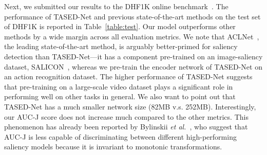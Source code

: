 \documentclass[10pt,twocolumn,letterpaper]{article}
\newcommand{\modelname}{TASED-Net}
\begin{document}
\begin{table}[!t]
\centering
{}
\caption{Performance comparison of \modelname{} with different $T$s (shown in parentheses) and temporal aggregation strategies on the validation set of DHF1K~\cite{wang2018revisiting}. The late two-step approach performs the best since it utilizes temporally rich features while avoiding overfitting.}
\label{table:val}
\end{table}

Next, we submitted our results to the DHF1K online benchmark~\cite{wang2018revisiting}. The performance of \modelname{} and previous state-of-the-art methods on the test set of DHF1K is reported in Table~\ref{table:test}. Our model outperforms other methods by a wide margin across all evaluation metrics. We note that ACLNet~\cite{wang2018revisiting}, the leading state-of-the-art method, is arguably better-primed for saliency detection than \modelname{}---it has a component pre-trained on an image-saliency dataset, SALICON~\cite{jiang2015salicon}, whereas we pre-train the encoder network of \modelname{} on an action recognition dataset. The higher performance of \modelname{} suggests that pre-training on a large-scale video dataset plays a significant role in performing well on other tasks in general. We also want to point out that \modelname{} has a much smaller network size (82MB v.s. 252MB). Interestingly, our AUC-J score does not increase much compared to the other metrics. This phenomenon has already been reported by Bylinskii \textit{et al.}~\cite{bylinskii2018different}, who suggest that AUC-J is less capable of discriminating between different high-performing saliency models because it is invariant to monotonic transformations.
\end{document}
